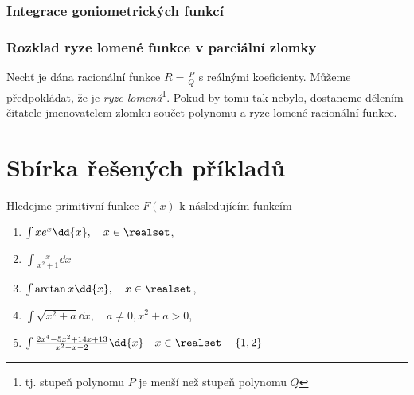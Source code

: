     \subsubsection{Integrace goniometrických funkcí}
      
    \subsubsection{Rozklad ryze lomené funkce v parciální zlomky}
      Nechť je dána racionální funkce $R = \frac{P}{Q}$ s reálnými koeficienty. Můžeme
      předpokládat, že je \emph{ryze lomená}\footnote{tj. stupeň polynomu $P$ je menší než
      stupeň polynomu $Q$}. Pokud by tomu tak nebylo, dostaneme dělením čitatele jmenovatelem
      zlomku součet polynomu a ryze lomené racionální funkce.

      

      
      
      

  \section{Sbírka řešených příkladů}
    Hledejme primitivní funkce \(F(x)\) k následujícím funkcím
    \begin{enumerate}
      \item \(\int{xe^x\dd{x}}, \quad x\in\realset\),
      \item \(\int\frac{x}{x^2+1}\dd{x}\)
      \item \(\int{\arctan x\dd{x}}, \quad x\in\realset\),
      \item \(\int{\sqrt{x^2+a}\dd{x}}, \quad a\neq0, x^2+a>0\),
      \item \(\int{\frac{2x^4-5x^2+14x+13}{x^2-x-2}\dd{x}} \quad x\in\realset - \{1,2\}\)
    \end{enumerate}

